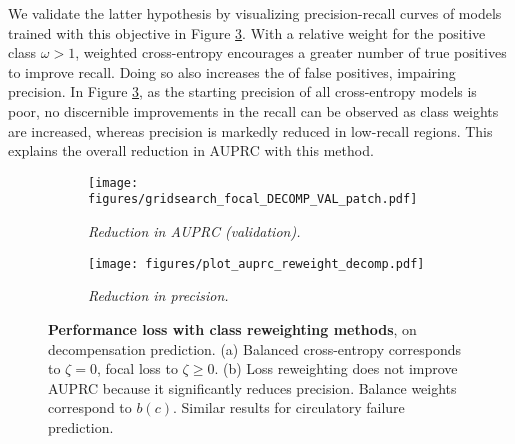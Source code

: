 \documentclass[nohyperref]{article}
\begin{document}
We validate the latter hypothesis by visualizing precision-recall curves of models trained with this objective in Figure \ref{fig:additional_PR_reweight}. With a relative weight for the positive class $\omega > 1$, weighted cross-entropy encourages a greater number of true positives to improve recall. Doing so also increases the of false positives, impairing precision. In Figure \ref{fig:additional_PR_reweight}, as the starting precision of all cross-entropy models is poor, no discernible improvements in the recall can be observed as class weights are increased, whereas precision is markedly reduced in low-recall regions. This explains the overall reduction in AUPRC with this method.

\begin{figure}[h]
\centering
\begin{subfigure}[b]{0.32\textwidth}
  \centering
\texttt{[image: figures/gridsearch\_focal\_DECOMP\_VAL\_patch.pdf]} 
  \caption{\textit{Reduction in AUPRC (validation).}}
\label{fig:grid_focal_decomp}
\end{subfigure} \hspace{4em}
\begin{subfigure}[b]{0.32\textwidth}
  \centering
  \texttt{[image: figures/plot\_auprc\_reweight\_decomp.pdf]}
  \caption{\textit{Reduction in precision.}}
  \label{fig:rw_PR_curve_decomp}
\end{subfigure}
\caption{\textbf{Performance loss with class reweighting methods}, on decompensation prediction. (a) Balanced cross-entropy corresponds to $\zeta=0$, focal loss to $\zeta \geq 0$. (b) Loss reweighting does not improve AUPRC because it significantly reduces precision. Balance weights correspond to $b(c)$. Similar results for circulatory failure prediction.}
\label{fig:additional_PR_reweight}
\end{figure}
\end{document}
